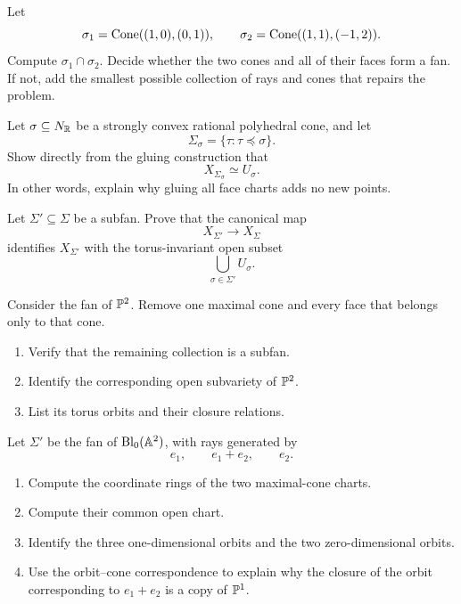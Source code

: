 \begin{exercises}

\item Let
\[
\sigma_1=\operatorname{Cone}((1,0),(0,1)),
\qquad
\sigma_2=\operatorname{Cone}((1,1),(-1,2)).
\]
Compute \(\sigma_1\cap\sigma_2\). Decide whether the two cones and all
of their faces form a fan. If not, add the smallest possible
collection of rays and cones that repairs the problem.

\item Let \(\sigma\subseteq N_{\mathbb{R}}\) be a strongly convex rational
polyhedral cone, and let
\[
\Sigma_\sigma=\{\tau:\tau\preceq\sigma\}.
\]
Show directly from the gluing construction that
\[
X_{\Sigma_\sigma}\simeq U_\sigma.
\]
In other words, explain why gluing all face charts adds no new points.

\item Let \(\Sigma'\subseteq\Sigma\) be a subfan. Prove that the
canonical map
\[
X_{\Sigma'}\longrightarrow X_\Sigma
\]
identifies \(X_{\Sigma'}\) with the torus-invariant open subset
\[
\bigcup_{\sigma\in\Sigma'}U_\sigma.
\]

\item Consider the fan of \(\mathbb{P}^2\). Remove one maximal cone and every
face that belongs only to that cone.
\begin{enumerate}[label=(\alph*),wide=0pt]
\item Verify that the remaining collection is a subfan.
\item Identify the corresponding open subvariety of \(\mathbb{P}^2\).
\item List its torus orbits and their closure relations.
\end{enumerate}

\item Let \(\Sigma'\) be the fan of \(\operatorname{Bl}_0(\mathbb{A}^2)\), with rays
generated by
\[
e_1,\qquad e_1+e_2,\qquad e_2.
\]
\begin{enumerate}[label=(\alph*),wide=0pt]
\item Compute the coordinate rings of the two maximal-cone charts.
\item Compute their common open chart.
\item Identify the three one-dimensional orbits and the two
zero-dimensional orbits.
\item Use the orbit--cone correspondence to explain why the closure of
the orbit corresponding to \(e_1+e_2\) is a copy of \(\mathbb{P}^1\).
\end{enumerate}


\end{exercises}
